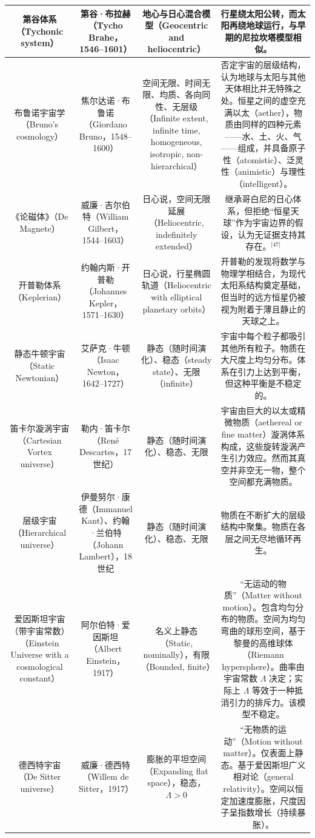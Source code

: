 \begin{table}[ht]
\begin{tabular}{|c|c|c|c|}
\hline
第谷体系（Tychonic system）& 第谷·布拉赫（Tycho Brahe，1546–1601）& 地心与日心混合模型（Geocentric and heliocentric）& 行星绕太阳公转，而太阳再绕地球运行，与早期的尼拉坎塔模型相似。\\
\hline
布鲁诺宇宙学（Bruno's cosmology）& 焦尔达诺·布鲁诺（Giordano Bruno，1548–1600）& 空间无限、时间无限、均质、各向同性、无层级（Infinite extent, infinite time, homogeneous, isotropic, non-hierarchical）& 否定宇宙的层级结构，认为地球与太阳与其他天体相比并无特殊之处。恒星之间的虚空充满以太（aether），物质由同样的四种元素——水、土、火、气——组成，并具备原子性（atomistic）、泛灵性（animistic）与理性（intelligent）。\\
\hline
《论磁体》（De Magnete）& 威廉·吉尔伯特（William Gilbert，1544–1603）& 日心说，空间无限延展（Heliocentric, indefinitely extended）& 继承哥白尼的日心体系，但拒绝“恒星天球”作为宇宙边界的假设，认为无证据支持其存在。\(^\text{[47]}\)\\
\hline
开普勒体系（Keplerian）& 约翰内斯·开普勒（Johannes Kepler，1571–1630）& 日心说，行星椭圆轨道（Heliocentric with elliptical planetary orbits）& 开普勒的发现将数学与物理学相结合，为现代太阳系结构奠定基础，但当时的远方恒星仍被视为附着于薄且静止的天球之上。\\
\hline
静态牛顿宇宙（Static Newtonian）& 艾萨克·牛顿（Isaac Newton，1642–1727）& 静态（随时间演化）、稳态（steady state）、无限（infinite）& 宇宙中每个粒子都吸引其他所有粒子。物质在大尺度上均匀分布。体系在引力上达到平衡，但这种平衡是不稳定的。\\
\hline
笛卡尔漩涡宇宙（Cartesian Vortex universe）& 勒内·笛卡尔（René Descartes，17 世纪）& 静态（随时间演化）、稳态、无限 & 宇宙由巨大的以太或精微物质（aethereal or fine matter）漩涡体系构成，这些旋转漩涡产生引力效应。然而其真空并非空无一物，整个空间都充满物质。\\
\hline
层级宇宙（Hierarchical universe）& 伊曼努尔·康德（Immanuel Kant）、约翰·兰伯特（Johann Lambert），18 世纪 & 静态（随时间演化）、稳态、无限 & 物质在不断扩大的层级结构中聚集。物质在各层之间无尽地循环再生。\\
\hline
爱因斯坦宇宙（带宇宙常数）（Einstein Universe with a cosmological constant）& 阿尔伯特·爱因斯坦（Albert Einstein，1917）& 名义上静态（Static, nominally），有限（Bounded, finite）& “无运动的物质”（Matter without motion）。包含均匀分布的物质。空间为均匀弯曲的球形空间，基于黎曼的高维球体（Riemann hypersphere）。曲率由宇宙常数 $\Lambda$ 决定；实际上 $\Lambda$ 等效于一种抵消引力的排斥力。该模型不稳定。\\
\hline
德西特宇宙（De Sitter universe）& 威廉·德西特（Willem de Sitter，1917）& 膨胀的平坦空间（Expanding flat space），稳态，$\Lambda > 0$ & “无物质的运动”（Motion without matter）。仅表面上静态。基于爱因斯坦广义相对论（general relativity）。空间以恒定加速度膨胀，尺度因子呈指数增长（持续暴胀）。\\

\end{tabular}
\end{table}

